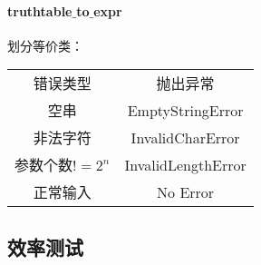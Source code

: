 	\paragraph{truthtable$\_$to$\_$expr\\}
		划分等价类：
		\begin{center}
			\begin{tabular}{cc}
				错误类型 & 抛出异常\\
				空串 & EmptyStringError\\
				非法字符 & InvalidCharError\\
				参数个数$!=2^n$ & InvalidLengthError\\
				正常输入 & No Error\\
		\end{tabular}				
		\end{center}

			
\subsection{效率测试}
